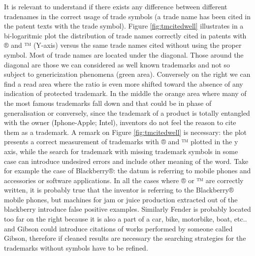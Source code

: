 \documentclass[]{book}
\begin{document}
It is relevant to understand if there exists any difference between
different tradenames in the correct usage of trade symbols (a trade name
has been cited in the patent texts with the trade symbol). Figure
\ref{fig:tmcitedwell} illustrates in a bi-logaritmic plot the
distribution of trade names correctly cited in patents with ® and ™
(Y-axis) versus the same trade names cited without using the proper
symbol. Most of trade names are located under the diagonal. Those around
the diagonal are those we can considered as well known trademarks and
not so subject to genericization phenomena (green area). Conversely on
the right we can find a read area where the ratio is even more shifted
toward the absence of any indication of protected trademark. In the
middle the orange area where many of the most famous trademarks fall
down and that could be in phase of generalisation or conversely, since
the trademark of a product is totally entangled with the owner
(Iphone-Apple; Intel), inventors do not feel the reason to cite them as
a trademark. A remark on Figure \ref{fig:tmcitedwell} is necessary: the
plot presents a correct measurement of trademarks with ® and ™ plotted
in the y axis, while the search for trademark with missing trademark
symbols in some case can introduce undesired errors and include other
meaning of the word. Take for example the case of Blackberry®: the datum
is referring to mobile phones and accessories or software applications.
In all the cases where ® or ™ are correctly written, it is probably true
that the inventor is referring to the Blackberry® mobile phones, but
machines for jam or juice production extracted out of the blackberry
introduce false positive examples. Similarly Fender is probably located
too far on the right because it is also a part of a car, bike,
motorbike, boat, etc.. and Gibson could introduce citations of works
performed by someone called Gibson, therefore if cleaned results are
necessary the searching strategies for the trademarks without symbols
have to be refined.
\end{document}
